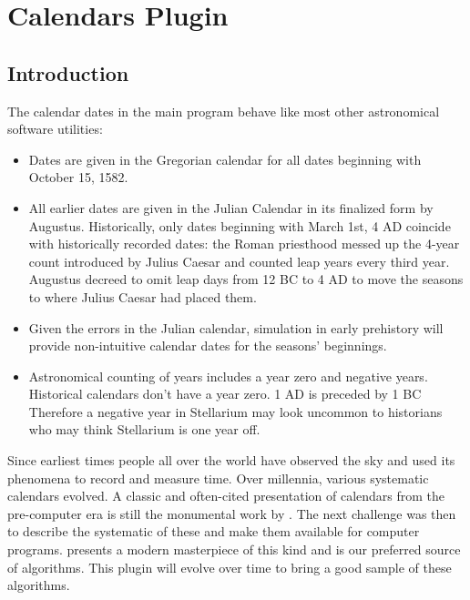 

\newpage
\section{Calendars Plugin}
\label{sec:plugin:Calendars}



\subsection{Introduction}
\label{sec:plugin:Calendars:Introduction}

The calendar dates in the main program behave like most other astronomical software utilities:

\begin{itemize}
\item Dates are given in the Gregorian calendar for all dates
  beginning with October 15, 1582.
\item All earlier dates are given in the Julian Calendar in its
  finalized form by Augustus. Historically, only dates beginning with
  March 1st, 4 AD coincide with historically recorded dates: the
  Roman priesthood messed up the 4-year count introduced by Julius
  Caesar and counted leap years every third year. Augustus decreed to
  omit leap days from 12 BC to 4 AD to move the seasons to where
  Julius Caesar had placed them.
\item Given the errors in the Julian calendar, simulation in early
  prehistory will provide non-intuitive calendar dates for the
  seasons' beginnings.
\item Astronomical counting of years includes a year zero and negative
  years. Historical calendars don't have a year zero. 1 AD is
  preceded by 1 BC Therefore a negative year in Stellarium may look
  uncommon to historians who may think Stellarium is one year off.
\end{itemize}


Since earliest times people all over the world have observed the sky
and used its phenomena to record and measure time. Over millennia,
various systematic calendars evolved. A classic and often-cited
presentation of calendars from the pre-computer era is still the
monumental work by \citet{Ginzel:ChronologieI, Ginzel:ChronologieII,
  Ginzel:ChronologieIII}.  The next challenge was then to describe
the systematic of these and make them available for computer programs.
\citet{Reingold-Dershowitz:2018} presents a modern masterpiece
of this kind and is our preferred source of algorithms. This plugin
 will evolve over time to bring a good sample of these algorithms.


